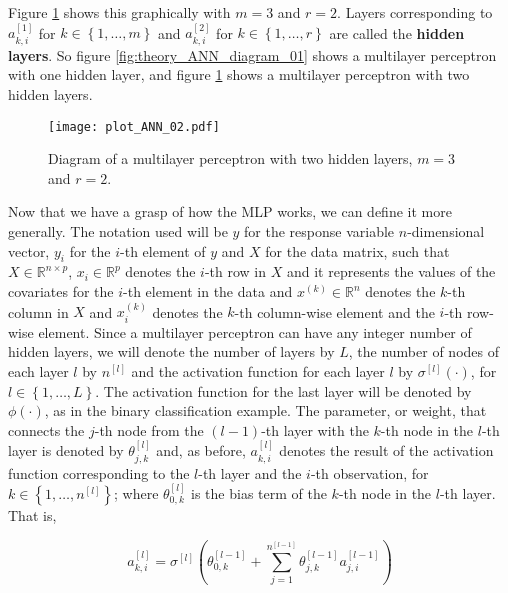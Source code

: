 Figure \ref{fig:theory_ANN_diagram_02} shows this graphically with $m = 3$ and $r = 2$. Layers corresponding to $a_{k,i}^{[1]}$ for $k \in \left\{ 1, \ldots, m \right\}$ and $a_{k,i}^{[2]}$ for $k \in \left\{ 1, \ldots, r \right\}$ are called the \textbf{hidden layers}. So figure \ref{fig:theory_ANN_diagram_01} shows a multilayer perceptron with one hidden layer, and figure \ref{fig:theory_ANN_diagram_02} shows a multilayer perceptron with two hidden layers.


\begin{figure}[H]
    \centering
    \texttt{[image: plot\_ANN\_02.pdf]}
    \caption{Diagram of a multilayer perceptron with two hidden layers, $m = 3$ and $r = 2$.}
    \label{fig:theory_ANN_diagram_02}
\end{figure}

Now that we have a grasp of how the MLP works, we can define it more generally. The notation used will be $y$ for the response variable $n$-dimensional vector, $y_i$ for the $i$-th element of $y$ and $X$ for the data matrix, such that $X \in \mathbb{R}^{n \times p}$, $x_i \in \mathbb{R}^p$ denotes the $i$-th row in $X$ and it represents the values of the covariates for the $i$-th element in the data and $x^{(k)} \in \mathbb{R}^n$ denotes the $k$-th column in $X$ and $x_i^{(k)}$ denotes the $k$-th column-wise element and the $i$-th row-wise element. Since a multilayer perceptron can have any integer number of hidden layers, we will denote the number of layers by $L$, the number of nodes of each layer $l$ by $n^{[l]}$ and the activation function for each layer $l$ by $\sigma^{[l]}(\cdot)$, for $l \in \left\{ 1, \ldots, L \right\}$. The activation function for the last layer will be denoted by $\phi(\cdot)$, as in the binary classification example. The parameter, or weight, that connects the $j$-th node from the $(l-1)$-th layer with the $k$-th node in the $l$-th layer is denoted by $\theta_{j,k}^{[l]}$ and, as before, $a_{k,i}^{[l]}$ denotes the result of the activation function corresponding to the $l$-th layer and the $i$-th observation, for $k \in \left\{ 1, \ldots, n^{[l]} \right\}$; where $\theta_{0,k}^{[l]}$ is the bias term of the $k$-th node in the $l$-th layer. That is,

\begin{equation}
  \label{eq:ann_act_funct_def}
  a_{k,i}^{[l]} = \sigma^{[l]} \left( \theta_{0,k}^{[l-1]} + \sum_{j = 1}^{n^{[l-1]}} \theta_{j,k}^{[l-1]} a_{j,i}^{[l-1]} \right)
\end{equation}

